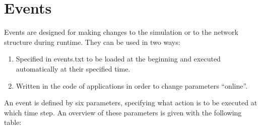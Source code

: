 \documentclass[11pt,fleqn]{book} %
\begin{document}

\section{Events}\label{sec:events}
Events are designed for making changes to the simulation or to the network structure during runtime. They can be used in two ways:
\begin{enumerate}
	\item Specified in events.txt to be loaded at the beginning and executed automatically at their specified time. 
	\item Written in the code of applications in order to change parameters “online”.
\end{enumerate}

An event is defined by six parameters, specifying what action is to be executed at which time step. An overview of these parameters is given with the following table:
\end{document}
